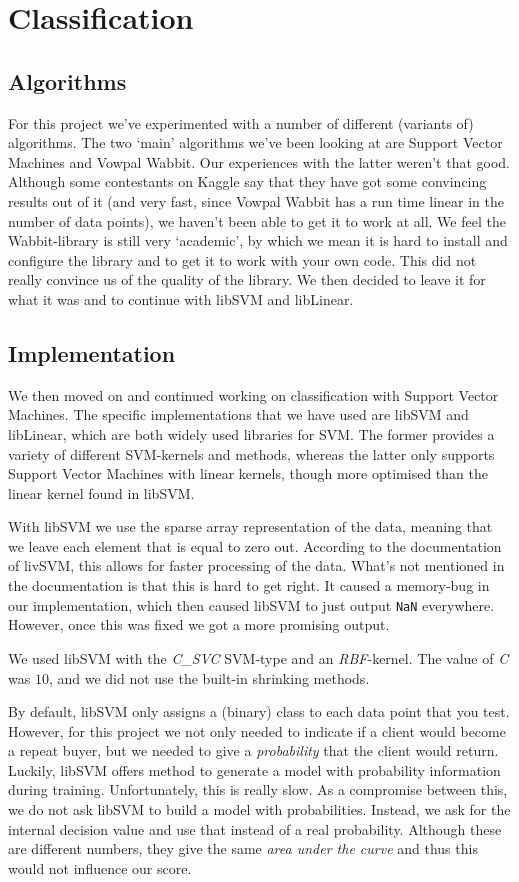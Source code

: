 \documentclass[a4paper]{article}
\begin{document}
\section{Classification}
\subsection{Algorithms}
For this project we've experimented with a number of different (variants of) algorithms. The two `main' algorithms we've been looking at are Support Vector Machines and Vowpal Wabbit. Our experiences with the latter weren't that good. Although some contestants on Kaggle say that they have got some convincing results out of it (and very fast, since Vowpal Wabbit has a run time linear in the number of data points), we haven't been able to get it to work at all. We feel the Wabbit-library is still very `academic', by which we mean it is hard to install and configure the library and to get it to work with your own code. This did not really convince us of the quality of the library. We then decided to leave it for what it was and to continue with libSVM and libLinear.
\subsection{Implementation}
We then moved on and continued working on classification with Support Vector Machines. The specific implementations that we have used are libSVM and libLinear, which are both widely used libraries for SVM. The former provides a variety of different SVM-kernels and methods, whereas the latter only supports Support Vector Machines with linear kernels, though more optimised than the linear kernel found in libSVM.

With libSVM we use the sparse array representation of the data, meaning that we leave each element that is equal to zero out. According to the documentation of livSVM, this allows for faster processing of the data. What's not mentioned in the documentation is that this is hard to get right. It caused a memory-bug in our implementation, which then caused libSVM to just output \texttt{NaN} everywhere. However, once this was fixed we got a more promising output.

We used libSVM with the \emph{C\_SVC} SVM-type and an \emph{RBF}-kernel. The value of \emph{C} was $10$, and we did not use the built-in shrinking methods.

By default, libSVM only assigns a (binary) class to each data point that you test. However, for this project we not only needed to indicate if a client would become a repeat buyer, but we needed to give a \emph{probability} that the client would return. Luckily, libSVM offers method to generate a model with probability information during training. Unfortunately, this is really slow. As a compromise between this, we do not ask libSVM to build a model with probabilities. Instead, we ask for the internal decision value and use that instead of a real probability. Although these are different numbers, they give the same \emph{area under the curve} and thus this would not influence our score.
\end{document}
